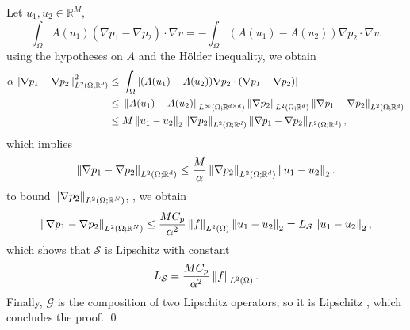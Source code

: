 Let $u_1, u_2 \in \mathbb{R}^M$, 
\begin{equation*}
\int_{\Omega} A(u_1) (\nabla p_1 - \nabla p_2) \cdot \nabla v = - \int_{\Omega} (A(u_1) - A(u_2)) \nabla p_2 \cdot \nabla v.
\end{equation*}
 using the hypotheses on $A$ and the H\"older inequality, we obtain
\begin{align*}
\alpha \left\|\nabla p_1 - \nabla p_2\right\|_{L^2(\Omega; \mathbb{R}^d)}^2 \le & \;  \int_{\Omega} \left | (A(u_1) - A(u_2)) \nabla p_2 \cdot (\nabla p_1 - \nabla p_2) \right | \\
\le & \; \left\|A(u_1) - A(u_2)\right\|_{L^{\infty}(\Omega; \mathbb{R}^{d \times d})} \left\|\nabla p_2\right\|_{L^2(\Omega; \mathbb{R}^d)} \left\|\nabla p_1 - \nabla p_2\right\|_{L^2(\Omega; \mathbb{R}^d)} \\
\le & \; M \left\|u_1 - u_2\right\|_2 \left\|\nabla p_2\right\|_{L^2(\Omega; \mathbb{R}^d)} \left\|\nabla p_1 - \nabla p_2\right\|_{L^2(\Omega; \mathbb{R}^d)},
\end{align*}
which implies 
\begin{equation} \label{intermediate}
\left\|\nabla p_1 - \nabla p_2\right\|_{L^2(\Omega; \mathbb{R}^d)} \le \frac{M}{\alpha} \left\|\nabla p_2\right\|_{L^2(\Omega; \mathbb{R}^d)} \left\|u_1 - u_2\right\|_2.
\end{equation}
 to bound $\left\|\nabla p_2\right\|_{L^2(\Omega; \mathbb{R}^N)}$, , we obtain
\begin{equation*}
\left\|\nabla p_1 - \nabla p_2\right\|_{L^2(\Omega; \mathbb{R}^N)} \le \frac{M C_p}{\alpha^2} \left\|f\right\|_{L^2(\Omega)} \left\|u_1 - u_2\right\|_2 = L_{\mathcal{S}} \left\|u_1 - u_2\right\|_2,
\end{equation*}
which shows that $\mathcal{S}$ is Lipschitz with constant
\[ L_{\mathcal{S}} = \frac{M C_p}{\alpha^2} \left\|f\right\|_{L^2(\Omega)}. \]
Finally, $\mathcal{G}$ is the composition of two Lipschitz operators, so it is Lipschitz , which concludes the proof.
\qed

